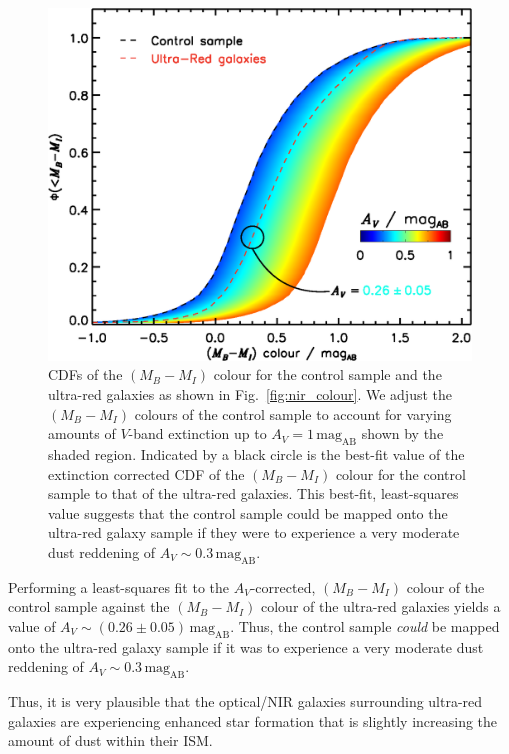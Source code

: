\documentclass[a4paper, fleqn, usenatbib]{mnras}
\newcommand{\magab}{\text{mag}_{\text{AB}}}
\newcommand{\urg}{ultra-red galaxy}
\newcommand{\urgs}{ultra-red galaxies}
\begin{document}
\begin{figure}
    \centering
    \includegraphics[width=\columnwidth]{av_extinct.eps}
    \caption[$(M_B-M_I)$ colour change with $V$-band extinction]{%
    CDFs of the $(M_B-M_I)$ colour for the control sample and the \urgs{} as shown in Fig.~\ref{fig:nir_colour}.
    We adjust the $(M_B-M_I)$ colours of the control sample to account for varying amounts of $V$-band extinction up to $A_V=1\,\magab{}$ shown by the shaded region.
    Indicated by a black circle is the best-fit value of the extinction corrected CDF of the $(M_B-M_I)$ colour for the control sample to that of the \urgs{}.
    This best-fit, least-squares value suggests that the control sample could be mapped onto the \urg{} sample if they were to experience a very moderate dust reddening of $A_V\sim0.3\,\magab{}$.
    }
    \label{fig:av_extinct}
\end{figure}

Performing a least-squares fit to the $A_V$-corrected, $(M_B-M_I)$ colour of the control sample against the $(M_B-M_I)$ colour of the \urgs{} yields a value of $A_V\sim(0.26\pm0.05)\,\magab{}$.
Thus, the control sample \emph{could} be mapped onto the \urg{} sample if it was to 
experience a very moderate dust reddening of $A_V\sim0.3\,\magab{}$.

Thus, it is very plausible that the optical/NIR galaxies surrounding \urgs{} are experiencing enhanced star formation that is slightly increasing the amount of dust within their ISM.
\end{document}
